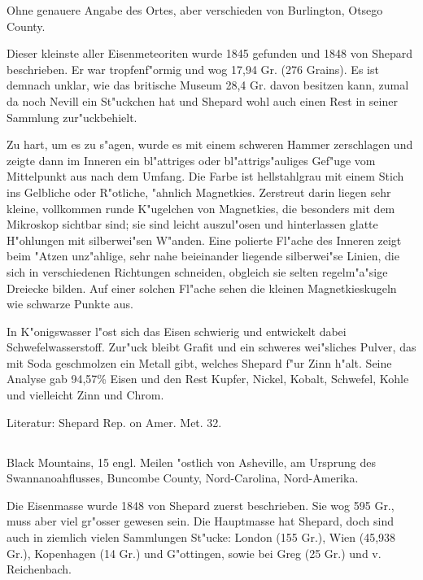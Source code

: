 \documentclass[a4paper, 11pt, oneside]{article}
\begin{document}
Ohne genauere Angabe des Ortes, aber verschieden von Burlington, Otsego County.

Dieser kleinste aller Eisenmeteoriten wurde 1845 gefunden und 1848 von Shepard beschrieben. Er war tropfenf"ormig und wog 17,94 Gr. (276 Grains). Es ist demnach unklar, wie das britische Museum 28,4 Gr. davon besitzen kann, zumal da noch Nevill ein St"uckchen hat und Shepard wohl auch einen Rest in seiner Sammlung zur"uckbehielt.

Zu hart, um es zu s"agen, wurde es mit einem schweren Hammer zerschlagen und zeigte dann im Inneren ein bl"attriges oder bl"attrigs"auliges Gef"uge vom Mittelpunkt aus nach dem Umfang. Die Farbe ist hellstahlgrau mit einem Stich ins Gelbliche oder R"otliche, "ahnlich Magnetkies. Zerstreut darin liegen sehr kleine, vollkommen runde K"ugelchen von Magnetkies, die besonders mit dem Mikroskop sichtbar sind; sie sind leicht auszul"osen und hinterlassen glatte H"ohlungen mit silberwei"sen W"anden. Eine polierte Fl"ache des Inneren zeigt beim "Atzen unz"ahlige, sehr nahe beieinander liegende silberwei"se Linien, die sich in verschiedenen Richtungen schneiden, obgleich sie selten regelm"a"sige Dreiecke bilden. Auf einer solchen Fl"ache sehen die kleinen Magnetkieskugeln wie schwarze Punkte aus.

In K"onigswasser l"ost sich das Eisen schwierig und entwickelt dabei Schwefelwasserstoff. Zur"uck bleibt Grafit und ein schweres wei"sliches Pulver, das mit Soda geschmolzen ein Metall gibt, welches Shepard f"ur Zinn h"alt. Seine Analyse gab 94,57\% Eisen und den Rest Kupfer, Nickel, Kobalt, Schwefel, Kohle und vielleicht Zinn und Chrom.

\normalsize
Literatur: Shepard Rep. on Amer. Met. 32.

\subsection{}
\LARGE
\paragraph{}
Black Mountains, 15 engl. Meilen "ostlich von Asheville, am Ursprung des Swannanoahflusses, Buncombe County, Nord-Carolina, Nord-Amerika.

Die Eisenmasse wurde 1848 von Shepard zuerst beschrieben. Sie wog 595 Gr., muss aber viel gr"osser gewesen sein. Die Hauptmasse hat Shepard, doch sind auch in ziemlich vielen Sammlungen St"ucke: London (155 Gr.), Wien (45,938 Gr.), Kopenhagen (14 Gr.) und G"ottingen, sowie bei Greg (25 Gr.) und v. Reichenbach.
\end{document}
